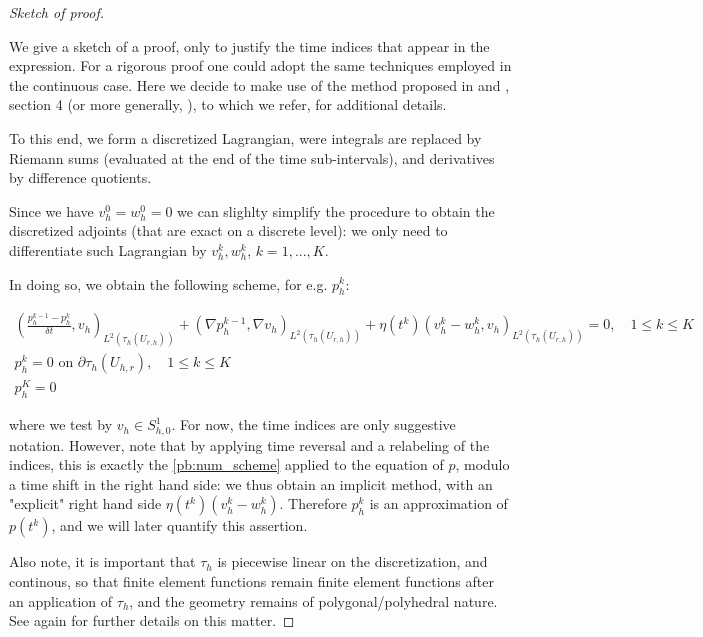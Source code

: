 \documentclass[english,a4paper,10pt,oneside]{scrbook}	%
\theoremstyle{break}
\newenvironment{mproof}[1][\proofname]{%
  \begin{proof}[#1]$ $\par\nobreak\ignorespaces
}{%
  \end{proof}
}
\renewcommand*{\proofname}{Proof}
\theoremstyle{remark}
\begin{document}
\begin{mproof}[Sketch of proof]

We give a sketch of a proof, only to justify the time indices that appear in the expression. For a rigorous proof one could adopt the same techniques employed in the continuous case. Here we decide to make use of the method proposed in and \cite{lindemann2}, section 4 (or more generally, \cite{lindemann}), to which we refer, for additional details. 

To this end, we form a discretized Lagrangian, were integrals are replaced by Riemann sums (evaluated at the end of the time sub-intervals), and derivatives by difference quotients.

Since we have $v_h^0=w_h^0=0$ we can slighlty simplify the procedure to obtain the discretized adjoints (that are exact on a discrete level): we only need to differentiate such Lagrangian by $v_h^k, w_h^k$, $k=1,...,K$. 

In doing so, we obtain the following scheme, for e.g. $p_h^k$:

\begin{align*}
	\left ( \frac{p_h^{k-1}-p_h^k}{\delta t}, v_h\right )_{L^2(\tau_h(U_{r,h}))} + (\nabla p_h^{k-1}, \nabla v_h )_{L^2(\tau_h(U_{r,h}))} + \eta(t^k)(v_h^k-w_h^k,v_h)_{L^2(\tau_h(U_{r,h}))} = 0, \quad 1\leq k \leq K\\
	p_h^k = 0 \text{ on } \partial \tau_h (U_{h,r}), \quad 1\leq k \leq K\\
	p_h^K=0 
\end{align*}

where we test by $v_h \in S^1_{h,0}$. For now, the time indices are only suggestive notation. However, note that by applying time reversal and a relabeling of the indices, this is exactly the \cref{pb:num_scheme} applied to the equation of $p$, modulo a time shift in the right hand side: we thus obtain an implicit method, with an "explicit" right hand side $\eta(t^k)(v_h^k-w_h^k)$. Therefore $p_h^k$ is an approximation of  $p(t^k)$, and we will later quantify this assertion.

Also note, it is important that $\tau_h$ is piecewise linear on the discretization, and continous, so that finite element functions remain finite element functions after an application of $\tau_h$, and the geometry remains of polygonal/polyhedral nature. See again \cite{lindemann2} for further details on this matter.

\end{mproof}
\end{document}
